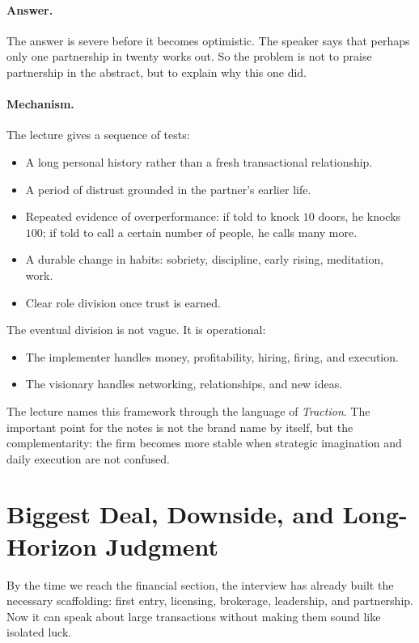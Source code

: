 \paragraph{Answer.}
The answer is severe before it becomes optimistic. The speaker says that perhaps only one partnership in twenty works out. So the problem is not to praise partnership in the abstract, but to explain why this one did.

\paragraph{Mechanism.}
The lecture gives a sequence of tests:
\begin{itemize}
\item A long personal history rather than a fresh transactional relationship.
\item A period of distrust grounded in the partner's earlier life.
\item Repeated evidence of overperformance: if told to knock \(10\) doors, he knocks \(100\); if told to call a certain number of people, he calls many more.
\item A durable change in habits: sobriety, discipline, early rising, meditation, work.
\item Clear role division once trust is earned.
\end{itemize}

The eventual division is not vague. It is operational:
\begin{itemize}
\item The implementer handles money, profitability, hiring, firing, and execution.
\item The visionary handles networking, relationships, and new ideas.
\end{itemize}
The lecture names this framework through the language of \emph{Traction}. The important point for the notes is not the brand name by itself, but the complementarity: the firm becomes more stable when strategic imagination and daily execution are not confused.

\section{Biggest Deal, Downside, and Long-Horizon Judgment}

By the time we reach the financial section, the interview has already built the necessary scaffolding: first entry, licensing, brokerage, leadership, and partnership. Now it can speak about large transactions without making them sound like isolated luck.

